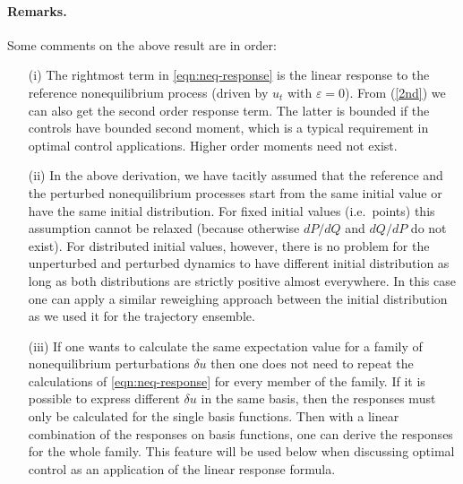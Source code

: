 \documentclass[]{tMPH2e}
\newcommand{\eps}{\varepsilon}
\begin{document}
\paragraph*{Remarks.} Some comments on the above result are in order:
\begin{itemize}

\item[(i)] The rightmost term in \eqref{eqn:neq-response} is the linear 
  response to the reference nonequilibrium process (driven by $u_t$ with $\eps=0$).  From (\ref{2nd}) we can also get the second order response term. The latter is bounded if the controls have bounded second moment, which is a typical requirement in optimal control applications. Higher order moments need not exist. 

\item[(ii)] In the above derivation, we have tacitly assumed that the reference and the perturbed nonequilibrium processes start from the same initial value or
  have the same initial distribution. For fixed initial values (i.e.~points) this assumption cannot be relaxed (because otherwise $dP/dQ$ and $dQ/dP$ do not exist). For distributed initial values, however, there is no problem for the unperturbed and perturbed dynamics to have different initial distribution as long as both distributions are strictly positive almost everywhere. In this case one can apply a similar reweighing approach between the initial distribution as we used it for the trajectory ensemble.  

\item[(iii)] If one wants to calculate the same expectation value for a family of nonequilibrium perturbations $\delta u$ then 
one does not need to repeat the calculations of \eqref{eqn:neq-response} for every member of the family. 
  If it is possible to
  express different $\delta u$ in the same basis, then the responses must only be
  calculated for the single basis functions. Then with a linear combination of the responses on basis functions, one can derive
  the responses for the whole family. This feature will be used below when discussing optimal control as an application of the linear response formula. 
  

\end{itemize}




\end{document}
